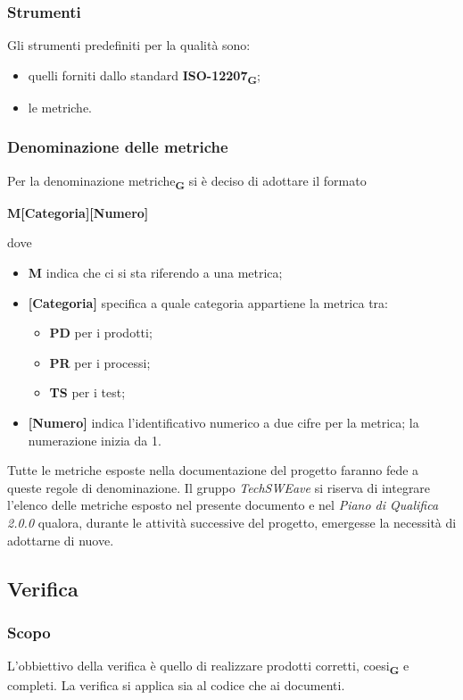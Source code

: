 \subsubsection{Strumenti}
Gli strumenti predefiniti per la qualità sono:
\begin{itemize}
    \item quelli forniti dallo standard \textbf{ISO-12207}\textsubscript{\textbf{G}};
    \item le metriche.
\end{itemize}
\subsubsection{Denominazione delle metriche}
Per la denominazione metriche\textsubscript{\textbf{G}} si è deciso di adottare il formato
\begin{center}
    \textbf{M[Categoria][Numero]}
\end{center}
dove
\begin{itemize}
    \item \textbf{M} indica che ci si sta riferendo a una metrica;
    \item \textbf{[Categoria]} specifica a quale categoria appartiene la metrica tra:\begin{itemize}
              \item \textbf{PD} per i prodotti;
              \item \textbf{PR} per i processi;
              \item \textbf{TS} per i test;
          \end{itemize}
    \item \textbf{[Numero]} indica l'identificativo numerico a due cifre per la metrica; la numerazione inizia da 1.
\end{itemize}
Tutte le metriche esposte nella documentazione del progetto faranno fede a queste regole di denominazione.
Il gruppo \emph{TechSWEave} si riserva di integrare l'elenco delle metriche esposto nel presente documento e nel \textit{Piano di Qualifica 2.0.0} qualora, durante le attività successive del progetto, emergesse la necessità di adottarne di nuove.
\subsection{Verifica}
\subsubsection{Scopo}
L'obbiettivo della verifica è quello di realizzare prodotti corretti, coesi\textsubscript{\textbf{G}} e completi. La verifica si applica sia al codice che ai documenti.
